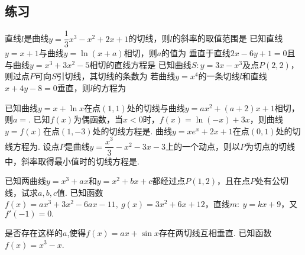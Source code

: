 \subsection{练习}
\begin{questions}
\qs 直线$ l $是曲线$ y=\dfrac{1}{3}x^3-x^2+2x+1 $的切线，则$ l $的斜率的取值范围是\xx
\onech{$ \left(-\infty,1\right] $}{$ \left[-1,0\right] $}{$ \left[0,1\right] $}{$ \left[1,+\infty\right) $}
\qs 已知直线$ y=x+1 $与曲线$ y=\ln (x+a) $相切，则$ a $的值为\xx
{}
\qs 垂直于直线$ 2x-6y+1=0 $且与曲线$ y=x^3+3x^2-5 $相切的直线方程是\xx
{}
\qs 已知曲线$ S:y=3x-x^3 $及点$ P(2,2) $，则过点$ P $可向$ S $引切线，其切线的条数为\xx
{} 
\qs 若曲线$ y=x^4 $的一条切线$ l $和直线$ x+4y-8=0 $垂直，则$ l $的方程为\xx
{}


\qs 已知曲线$y=x+\ln x$在点$(1,1)$处的切线与曲线$y=ax^2+(a+2)x+1$相切，则$a=$\tk.
\qs 已知$f(x)$为偶函数，当$x<0$时，$f(x)=\ln \left(-x\right)+3x$，则曲线$y=f(x)$在点$(1,-3)$处的切线方程是\tk.
\qs 曲线$ y=xe^x+2x+1 $在点$ (0,1) $处的切线方程为\tk.
\qs 设点$ P $是曲线$ y=\dfrac{x^3}{3}-x^2-3x-3 $上的一个动点，则以$ P $为切点的切线中，斜率取得最小值时的切线方程是\tk.

\kb
\qs 已知两曲线$ y=x^3+ax $和$ y=x^2+bx+c $都经过点$ P(1,2)$，且在点$ P $处有公切线，试求$ a,b,c $值.
\vspace{5em}
\qs 已知函数$f(x)=ax^3+3x^2-6ax-11,~g(x)=3x^2+6x+12$，直线$ m:~y=kx+9 $，又$ f'(-1)=0. $
\kb
\qs 是否存在这样的$ a $,使得$ f(x)=ax+\sin x $存在两切线互相垂直.
\kb 
\qs 已知函数$f(x)=x^3-x$.


\end{questions}
